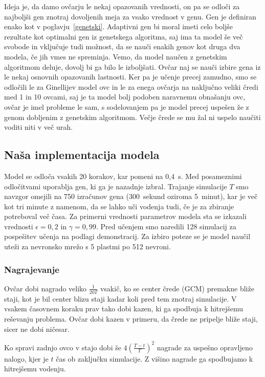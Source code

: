 Ideja je, da damo ovčarju le nekaj opazovanih vrednosti, on pa se odloči za najboljši gen znotraj dovoljenih meja za vsako vrednost v genu. Gen je definiran enako kot v poglavju~\ref{genetski}. Adaptivni gen bi moral imeti celo boljše rezultate kot optimalni gen iz genetskega algoritma, saj ima ta model še več svobode in vključuje tudi možnost, da se nauči enakih genov kot druga dva modela, če jih vmes ne spreminja. Vemo, da model naučen z genetskim algoritmom deluje, dovolj bi ga bilo le izboljšati. Ovčar naj se nauči izbire gena iz le nekaj osnovnih opazovanih lastnosti. Ker pa je učenje precej zamudno, smo se odločili le za Ginellijev model ovc in le za enega ovčarja na naključno veliki čredi med 1 in 10 ovcami, saj je ta model bolj podoben naravnemu obnašanju ovc, ovčar je imel probleme le sam, s sodelovanjem pa je model precej uspešen že z genom dobljenim z genetskim algoritmom. Večje črede se mu žal ni uspelo naučiti voditi niti v več urah.

\subsection{Naša implementacija modela}

Model se odloča vsakih 20 korakov, kar pomeni na 0,4~s. Med posameznimi odločitvami uporablja gen, ki ga je nazadnje izbral. Trajanje simulacije $T$ smo navzgor omejili na 750 izračunov gena (300~sekund oziroma 5~minut), kar je več kot tri minute z namenom, da se lahko uči vodenja tudi, če je za zbiranje potreboval več časa. Za primerni vrednosti parametrov modela sta se izkazali vrednosti $\epsilon=0,2$ in $\gamma=0,99$. Pred učenjem smo naredili 128 simulacij za pospešitev učenja na podlagi demonstracij. Za izbiro poteze se je model naučil uteži za nevronsko mrežo s 5 plastmi po 512 nevroni.

\subsubsection{Nagrajevanje}

Ovčar dobi nagrado veliko $\frac{1}{20T}$ vsakič, ko se center črede (GCM) premakne bliže staji, kot je bil center blizu staji kadar koli pred tem znotraj simulacije. V vsakem časovnem koraku prav tako dobi kazen, ki ga spodbuja k hitrejšemu reševanju problema. Ovčar dobi kazen v primeru, da črede ne pripelje bliže staji, sicer ne dobi ničesar.

Ko spravi zadnjo ovco v stajo dobi še $4(\frac{T - t}{T})^2$ nagrade za uspešno opravljeno nalogo, kjer je $t$ čas ob zaključku simulacije. Z višino nagrade ga spodbujamo k hitrejšemu vodenju.

